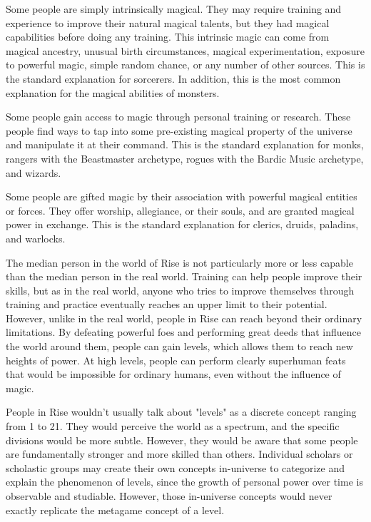   Some people are simply intrinsically magical.
  They may require training and experience to improve their natural magical talents, but they had magical capabilities before doing any training.
  This intrinsic magic can come from magical ancestry, unusual birth circumstances, magical experimentation, exposure to powerful magic, simple random chance, or any number of other sources.
  This is the standard explanation for sorcerers.
  In addition, this is the most common explanation for the magical abilities of monsters.

  Some people gain access to magic through personal training or research.
  These people find ways to tap into some pre-existing magical property of the universe and manipulate it at their command.
  This is the standard explanation for monks, rangers with the Beastmaster archetype, rogues with the Bardic Music archetype, and wizards.

  Some people are gifted magic by their association with powerful magical entities or forces.
  They offer worship, allegiance, or their souls, and are granted magical power in exchange.
  This is the standard explanation for clerics, druids, paladins, and warlocks.

  The median person in the world of Rise is not particularly more or less capable than the median person in the real world.
  Training can help people improve their skills, but as in the real world, anyone who tries to improve themselves through training and practice eventually reaches an upper limit to their potential.
  However, unlike in the real world, people in Rise can reach beyond their ordinary limitations.
  By defeating powerful foes and performing great deeds that influence the world around them, people can gain levels, which allows them to reach new heights of power.
  At high levels, people can perform clearly superhuman feats that would be impossible for ordinary humans, even without the influence of magic.

  People in Rise wouldn't usually talk about "levels" as a discrete concept ranging from 1 to 21.
  They would perceive the world as a spectrum, and the specific divisions would be more subtle.
  However, they would be aware that some people are fundamentally stronger and more skilled than others.
  Individual scholars or scholastic groups may create their own concepts in-universe to categorize and explain the phenomenon of levels, since the growth of personal power over time is observable and studiable.
  However, those in-universe concepts would never exactly replicate the metagame concept of a level.


